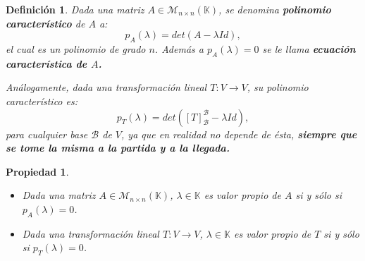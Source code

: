 \documentclass[12pt]{book}
\newtheorem{defi}{Definici\'on}
\newtheorem{prop}{Propiedad}
\def\K{\mathbb{K}}
\def\B{\mathcal{B}}
\begin{document}
\begin{defi}Dada una matriz $A\in\mathcal{M}_{n\times n}(\K)$, se denomina {\em \textbf{polinomio caracter\'istico}} de $A$ a:
$$p_A(\lambda)=det(A-\lambda Id),$$
el cual es un polinomio de grado $n$. 
Adem\'as a $p_A(\lambda)=0$ se le llama {\em \textbf{ecuaci\'on caracter\'istica de $A$.}}

Análogamente, dada una transformación lineal $T:V\rightarrow V$, su polinomio característico es:
$$p_T(\lambda)=det([T]_\B^\B-\lambda Id),$$
para cualquier base $\B$ de $V$, ya que en realidad no depende de ésta, {\bf siempre que se tome la misma a la partida y a la llegada.}
\end{defi}

\vspace{0.3 cm}

\begin{prop}
\begin{itemize}
\item Dada una matriz $A\in\mathcal{M}_{n\times n}(\K)$, $\lambda\in\K$ es valor propio de $A$ si  y s\'olo si $p_A(\lambda)=0$.
\item Dada una transformación lineal $T:V\rightarrow V$, $\lambda\in\K$ es valor propio de $T$ si  y s\'olo si $p_T(\lambda)=0$.
\end{itemize}
\end{prop}

\vspace{0.3 cm}
\end{document}
